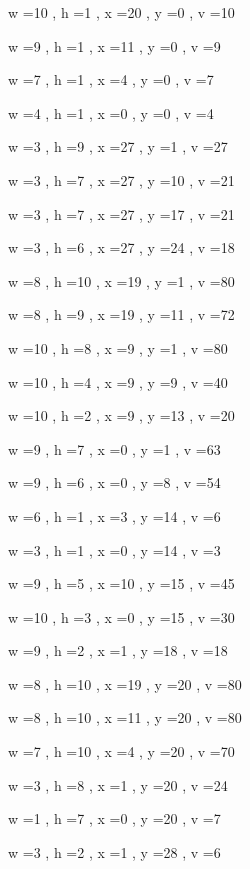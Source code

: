 \documentclass[11pt]{article}
\begin{document}


w =10 , h =1 , x =20 , y =0 , v =10
\par
w =9 , h =1 , x =11 , y =0 , v =9
\par
w =7 , h =1 , x =4 , y =0 , v =7
\par
w =4 , h =1 , x =0 , y =0 , v =4
\par
w =3 , h =9 , x =27 , y =1 , v =27
\par
w =3 , h =7 , x =27 , y =10 , v =21
\par
w =3 , h =7 , x =27 , y =17 , v =21
\par
w =3 , h =6 , x =27 , y =24 , v =18
\par
w =8 , h =10 , x =19 , y =1 , v =80
\par
w =8 , h =9 , x =19 , y =11 , v =72
\par
w =10 , h =8 , x =9 , y =1 , v =80
\par
w =10 , h =4 , x =9 , y =9 , v =40
\par
w =10 , h =2 , x =9 , y =13 , v =20
\par
w =9 , h =7 , x =0 , y =1 , v =63
\par
w =9 , h =6 , x =0 , y =8 , v =54
\par
w =6 , h =1 , x =3 , y =14 , v =6
\par
w =3 , h =1 , x =0 , y =14 , v =3
\par
w =9 , h =5 , x =10 , y =15 , v =45
\par
w =10 , h =3 , x =0 , y =15 , v =30
\par
w =9 , h =2 , x =1 , y =18 , v =18
\par
w =8 , h =10 , x =19 , y =20 , v =80
\par
w =8 , h =10 , x =11 , y =20 , v =80
\par
w =7 , h =10 , x =4 , y =20 , v =70
\par
w =3 , h =8 , x =1 , y =20 , v =24
\par
w =1 , h =7 , x =0 , y =20 , v =7
\par
w =3 , h =2 , x =1 , y =28 , v =6
\par
\newpage
\end{document}
